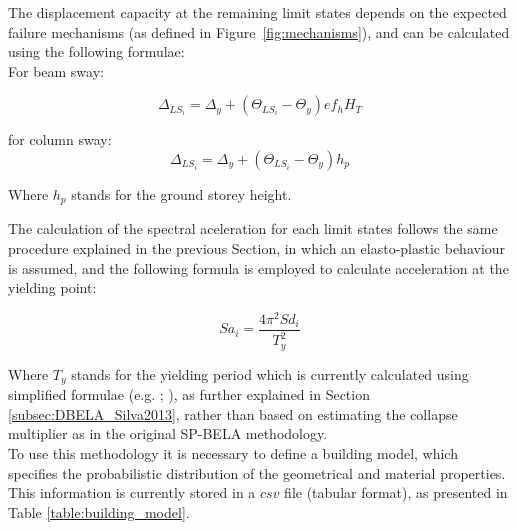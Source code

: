 The displacement capacity at the remaining limit states depends on the expected failure mechanisms (as defined in Figure~\ref{fig:mechanisms}), and can be calculated using the following formulae:\\

For beam sway:

\begin{equation}
	\Delta_{LS_i} = \Delta_y + (\Theta_{LS_i} - \Theta_y)ef_hH_T
\end{equation}

for column sway:
\begin{equation}
	\Delta_{LS_i} = \Delta_y + (\Theta_{LS_i} - \Theta_y)h_p
\end{equation}

Where $h_p$ stands for the ground storey height.

The calculation of the spectral aceleration for each limit states follows the same procedure explained in the previous Section, in which an elasto-plastic behaviour is assumed, and the following formula is employed to calculate acceleration at the yielding point:

\begin{equation}
	Sa_i = \frac{4\pi^2Sd_i}{T_y^2}
\end{equation}

Where $T_y$ stands for the yielding period which is currently calculated using simplified formulae (e.g. \cite{CrowleyPinho2004}; \cite{CrowleyPinho2006}), as further explained in Section \ref{subsec:DBELA_Silva2013}, rather than based on estimating the collapse multiplier as in the original SP-BELA methodology.\\

To use this methodology it is necessary to define a building model, which specifies the probabilistic distribution of the geometrical and material properties. This information is currently stored in a $csv$ file (tabular format), as presented in Table \ref{table:building_model}.


